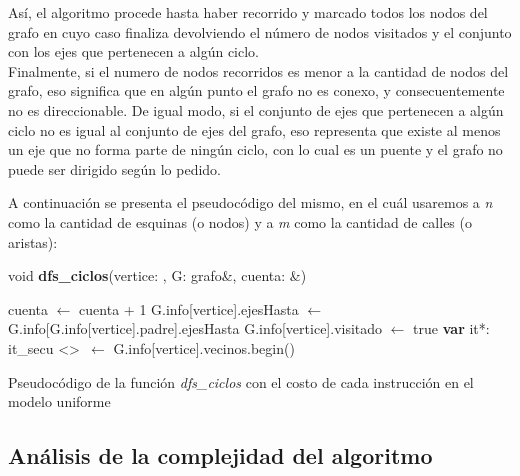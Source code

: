 Así, el algoritmo procede hasta haber recorrido y marcado todos los nodos del grafo en cuyo caso finaliza devolviendo el número de nodos visitados y el conjunto con los ejes que pertenecen a algún ciclo. \\
Finalmente, si el numero de nodos recorridos es menor a la cantidad de nodos del grafo, eso significa que en algún punto el grafo no es conexo, y consecuentemente no es direccionable. De igual modo, si el conjunto de ejes que pertenecen a algún ciclo no es igual al conjunto de ejes del grafo, eso representa que existe al menos un eje que no forma parte de ningún ciclo, con lo cual es un puente y el grafo no puede ser dirigido según lo pedido.

A continuación se presenta el pseudocódigo del mismo, en el cuál usaremos a \textit{n} como la cantidad de esquinas (o nodos) y a \textit{m} como la cantidad de calles (o aristas): \\

\incmargin{1em}
\linesnumbered
{}

void \textbf{dfs\_ciclos}(vertice: \nat, G: grafo\&, cuenta: \nat\&) \\
\begin{algorithm}[H]
	\BlankLine
	cuenta $\leftarrow$ cuenta + 1 
	G.info[vertice].ejesHasta $\leftarrow$ G.info[G.info[vertice].padre].ejesHasta 
	G.info[vertice].visitado $\leftarrow$ true 
	\BlankLine
	\textbf{var} it*: it\_secu \textless \nat \textgreater \ $\leftarrow $ G.info[vertice].vecinos.begin() 
	\BlankLine

	\caption{Pseudocódigo de la función \textit{dfs\_ciclos} con el costo de cada instrucción en el modelo uniforme}
\end{algorithm}


\subsection{Análisis de la complejidad del algoritmo}
\label{complejidad2}

